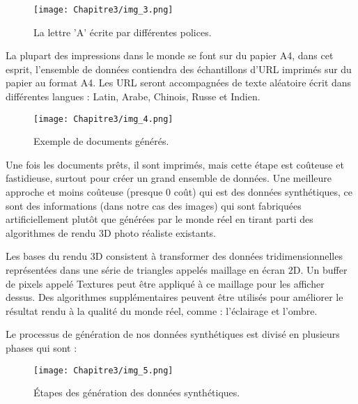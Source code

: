           \begin{figure}[H]
               \centering
               \texttt{[image: Chapitre3/img\_3.png]}
               \caption{La lettre 'A' écrite par différentes polices.}
               \label{img4}
               \end{figure}

La plupart des impressions dans le monde se font sur du papier A4, dans cet esprit, l'ensemble de données contiendra des échantillons d'URL imprimés sur du papier au format A4. Les URL seront accompagnées de texte aléatoire écrit dans différentes langues : Latin, Arabe, Chinois, Russe et Indien.
          \begin{figure}[H]
               \centering
               \texttt{[image: Chapitre3/img\_4.png]}
               \caption{Exemple de documents générés.}
               \label{img5}
               \end{figure}

Une fois les documents prêts, il sont imprimés, mais cette étape est coûteuse et fastidieuse, surtout pour créer un grand ensemble de données. Une meilleure approche et moins coûteuse (presque 0 coût) qui est des données synthétiques, ce sont des informations (dans notre cas des images) qui sont fabriquées artificiellement plutôt que générées par le monde réel en tirant parti des algorithmes de rendu 3D photo réaliste existants.

Les bases du rendu 3D consistent à transformer des données tridimensionnelles représentées dans une série de triangles appelés maillage en écran 2D. 
Un buffer de pixels appelé Textures peut être appliqué à ce maillage pour les afficher dessus. Des algorithmes supplémentaires peuvent être utilisés pour améliorer le résultat rendu à la qualité du monde réel, comme : l'éclairage et l'ombre.

Le processus de génération de nos données synthétiques est divisé en plusieurs phases qui sont :
          \begin{figure}[H]
               \centering
               \texttt{[image: Chapitre3/img\_5.png]}
               \caption{Étapes des génération des données synthétiques.}
               \label{img6}
               \end{figure}

